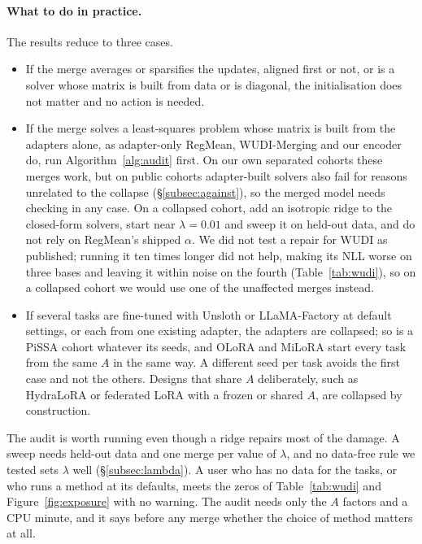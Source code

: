 \paragraph{What to do in practice.} The results reduce to three cases.
\begin{itemize}[leftmargin=*,itemsep=1pt,topsep=2pt]
\item If the merge averages or sparsifies the updates, aligned first or not,
  or is a solver whose matrix is built from data or is diagonal, the
  initialisation does not matter and no action is needed.
\item If the merge solves a least-squares problem whose matrix is built from
  the adapters alone, as adapter-only RegMean, WUDI-Merging and our encoder
  do, run Algorithm~\ref{alg:audit} first. On our own separated cohorts these
  merges work, but on public cohorts adapter-built solvers also fail for
  reasons unrelated to the collapse (\S\ref{subsec:against}), so the merged
  model needs checking in any case. On a collapsed cohort, add an isotropic
  ridge to the closed-form solvers, start near $\lambda = 0.01$ and sweep it on
  held-out data, and do not rely on RegMean's shipped $\alpha$. We did not test
  a repair for WUDI as published; running it ten times longer did not help,
  making its NLL worse on three bases and leaving it within noise on the fourth
  (Table~\ref{tab:wudi}), so on a collapsed cohort we would use one of the
  unaffected merges instead.
\item If several tasks are fine-tuned with Unsloth or LLaMA-Factory at default
  settings, or each from one existing adapter, the adapters are collapsed; so
  is a PiSSA cohort whatever its seeds, and OLoRA and MiLoRA start every task
  from the same $A$ in the same way. A different seed per task avoids the first
  case and not the others. Designs that share $A$ deliberately, such as
  HydraLoRA or federated LoRA with a frozen or shared $A$, are collapsed by
  construction.
\end{itemize}
The audit is worth running even though a ridge repairs most of the damage. A
sweep needs held-out data and one merge per value of $\lambda$, and no
data-free rule we tested sets $\lambda$ well (\S\ref{subsec:lambda}). A user
who has no data for the tasks, or who runs a method at its defaults, meets the
zeros of Table~\ref{tab:wudi} and Figure~\ref{fig:exposure} with no warning.
The audit needs only the $A$ factors and a CPU minute, and it says before any
merge whether the choice of method matters at all.

